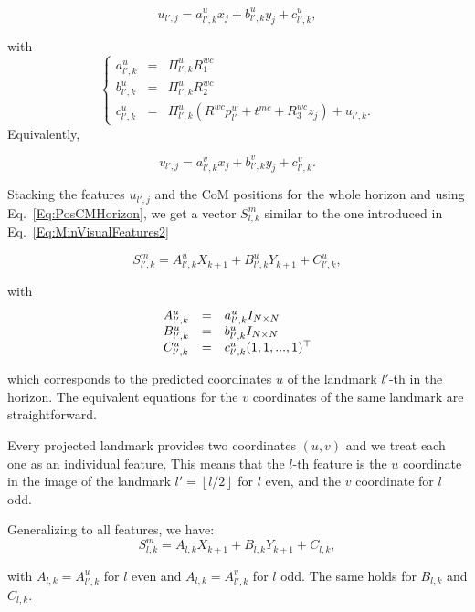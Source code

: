 \begin{equation}
\label{Eq:FeaturesUReduced}
 u_{l',j} = a^u_{l',k} x_j + b^u_{l',k} y_j + c^u_{l',k},
\end{equation}

with 
$$
\left\{
\begin{array}{ccl}
a^u_{l',k} & = & \Pi^u_{l',k} R^{wc}_1\\
b^u_{l',k} & = & \Pi^u_{l',k} R^{wc}_2\\
c^u_{l',k} & = & \Pi^u_{l',k} (R^{wc} p^{w}_{l'} + t^{mc} + R^{wc}_3 z_j) + u_{l',k}.
\end{array}
\right.
$$
Equivalently,

\begin{equation}
\label{Eq:FeaturesVReduced}
  v_{l',j} = a^v_{l',k} x_j + b^v_{l',k} y_j + c^v_{l',k}.
\end{equation}

Stacking the features $u_{l',j}$ and the CoM positions for the whole horizon and using Eq.~\ref{Eq:PosCMHorizon}, we get a vector $S^m_{l,k}$ similar to the one introduced in Eq.~\ref{Eq:MinVisualFeatures2} 

\begin{equation*}
S^m_{l',k} = A^u_{l',k} X_{k+1} + B^u_{l',k} Y_{k+1} + C_{l',k}^u,
\end{equation*}

with 
$$
\begin{array}{ccl}
A^u_{l',k} &=& a^u_{l',k} I_{N\times N}\\
B^u_{l',k} &=& b^u_{l',k} I_{N\times N}\\
C_{l',k}^u &=& c^u_{l',k} (1,1,...,1)^{\top}
\end{array}
$$

 which corresponds to the predicted coordinates $u$ of the landmark $l'$-th in the horizon.
The equivalent equations for the $v$ coordinates of the same landmark are straightforward.

Every projected landmark provides two coordinates $(u,v)$ and we treat each one as an individual feature. This means that the $l$-th feature is the $u$ coordinate in the image of the landmark $l' = \left \lfloor l/2 \right \rfloor$ for $l$ even, and the $v$ coordinate for $l$ odd.

Generalizing to all features, we have:
\begin{equation}
\label{Eq:FeaturesStacked}
 S^m_{l,k} = A_{l,k} X_{k+1} + B_{l,k} Y_{k+1} + C_{l,k},
\end{equation}

with $A_{l,k} = A^u_{l',k}$ for $l$ even and $A_{l,k} = A^v_{l',k}$ for $l$ odd. The same holds for $B_{l,k}$ and $C_{l,k}$.

